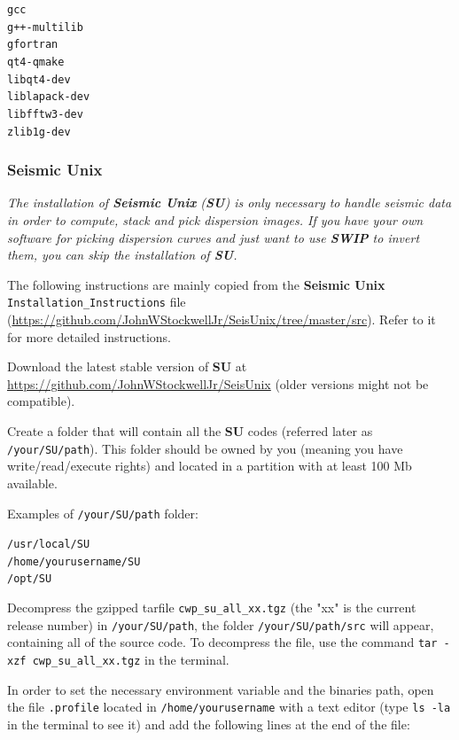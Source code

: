 \documentclass[twoside,a4paper]{article}
\def\SWIP{\textbf{SWIP}}
\def\SU{\textbf{SU}}
\def\SeismicUnix{\textbf{Seismic Unix}}
\begin{document}
\verb|gcc|\\
\verb|g++-multilib|\\
\verb|gfortran|\\
\verb|qt4-qmake|\\
\verb|libqt4-dev|\\
\verb|liblapack-dev|\\
\verb|libfftw3-dev|\\
\verb|zlib1g-dev|

\subsubsection{Seismic Unix}
\textit{The installation of {\SeismicUnix} ({\SU}) is only necessary to handle seismic data in order to compute, stack and pick dispersion images. If you have your own software for picking dispersion curves and just want to use {\SWIP} to invert them, you can skip the installation of {\SU}.}

The following instructions are mainly copied from the {\SeismicUnix} \verb|Installation_Instructions| file (\url{https://github.com/JohnWStockwellJr/SeisUnix/tree/master/src}). Refer to it for more detailed instructions.

Download the latest stable version of {\SU} at \url{https://github.com/JohnWStockwellJr/SeisUnix} (older versions might not be compatible).

Create a folder that will contain all the {\SU} codes (referred later as \verb|/your/SU/path|). This folder should be owned by you (meaning you have write/read/execute rights) and located in a partition with at least 100 Mb available.

Examples of \verb|/your/SU/path| folder:

\verb|/usr/local/SU|\\
\verb|/home/yourusername/SU|\\
\verb|/opt/SU|

Decompress the gzipped tarfile \verb|cwp_su_all_xx.tgz| (the "xx" is the current release number) in \verb|/your/SU/path|, the folder \verb|/your/SU/path/src| will appear, containing all of the source code. To decompress the file, use the command \verb|tar -xzf cwp_su_all_xx.tgz| in the terminal.

In order to set the necessary environment variable and the binaries path, open the file \verb|.profile| located in \verb|/home/yourusername| with a text editor (type \verb|ls -la| in the terminal to see it) and add the following lines at the end of the file:
\end{document}

